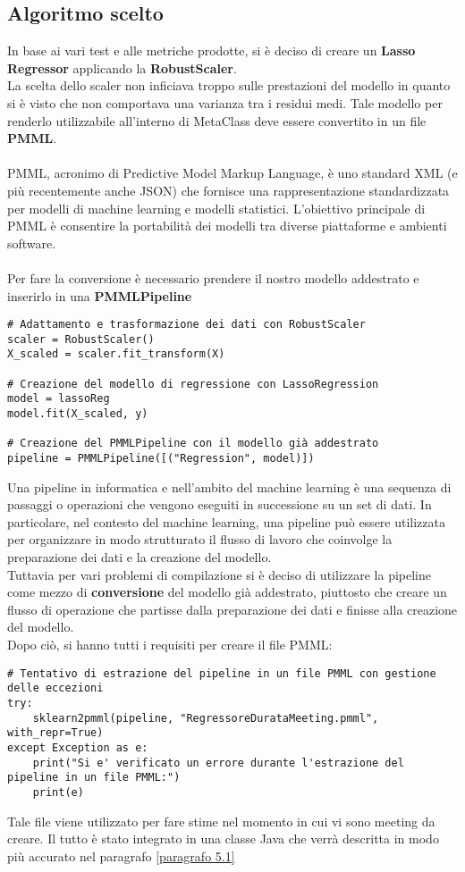 \subsection{Algoritmo scelto}
\fancyhead[]{}

In base ai vari test e alle metriche prodotte, si è deciso di creare un \textbf{Lasso Regressor} applicando la \textbf{RobustScaler}.\\
La scelta dello scaler non inficiava troppo sulle prestazioni del modello in quanto si è visto che non comportava una varianza tra i residui medi.
Tale modello per renderlo utilizzabile all'interno di MetaClass deve essere convertito in un file \textbf{PMML}. \\ \\
PMML, acronimo di Predictive Model Markup Language, è uno standard XML (e più recentemente anche JSON) che fornisce una rappresentazione standardizzata per modelli di machine learning e modelli statistici. L'obiettivo principale di PMML è consentire la portabilità dei modelli tra diverse piattaforme e ambienti software. \\ \\ 
Per fare la conversione è necessario prendere il nostro modello addestrato e inserirlo in una \textbf{PMMLPipeline} \\
\begin{lstlisting}
# Adattamento e trasformazione dei dati con RobustScaler
scaler = RobustScaler()
X_scaled = scaler.fit_transform(X)

# Creazione del modello di regressione con LassoRegression
model = lassoReg
model.fit(X_scaled, y)

# Creazione del PMMLPipeline con il modello già addestrato
pipeline = PMMLPipeline([("Regression", model)])
\end{lstlisting}

Una pipeline in informatica e nell'ambito del machine learning è una sequenza di passaggi o operazioni che vengono eseguiti in successione su un set di dati. In particolare, nel contesto del machine learning, una pipeline può essere utilizzata per organizzare in modo strutturato il flusso di lavoro che coinvolge la preparazione dei dati e la creazione del modello. \\
Tuttavia per vari problemi di compilazione si è deciso di utilizzare la pipeline come mezzo di \textbf{conversione} del modello già addestrato, piuttosto che creare un flusso di operazione che partisse dalla preparazione dei dati e finisse alla creazione del modello. \\
Dopo ciò, si hanno tutti i requisiti per creare il file PMML: \\
\begin{lstlisting}
# Tentativo di estrazione del pipeline in un file PMML con gestione delle eccezioni
try:
    sklearn2pmml(pipeline, "RegressoreDurataMeeting.pmml", with_repr=True)
except Exception as e:
    print("Si e' verificato un errore durante l'estrazione del pipeline in un file PMML:")
    print(e)
\end{lstlisting}
Tale file viene utilizzato per fare stime nel momento in cui vi sono meeting da creare. Il tutto è stato integrato in una classe Java che verrà descritta in modo più accurato nel paragrafo \ref{paragrafo 5.1}
